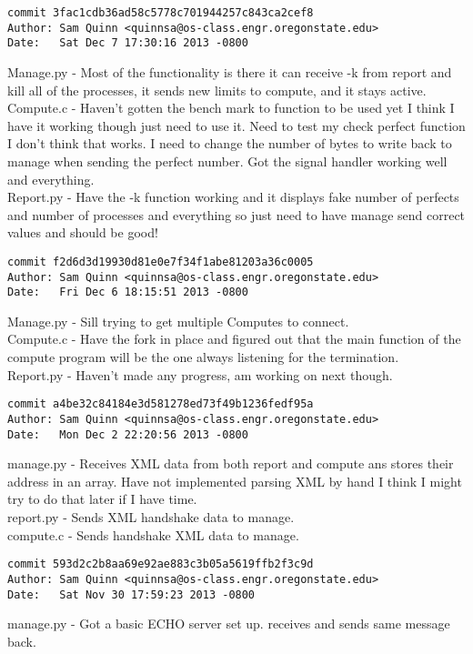 \documentclass[letterpaper,10pt,notitlepage,fleqn]{article}
\begin{document}
\begin{verbatim}
commit 3fac1cdb36ad58c5778c701944257c843ca2cef8
Author: Sam Quinn <quinnsa@os-class.engr.oregonstate.edu>
Date:   Sat Dec 7 17:30:16 2013 -0800
\end{verbatim}
    Manage.py - Most of the functionality is there it can receive -k from report and kill all of the processes, it sends new limits to compute, and it stays active.\\
    Compute.c - Haven't gotten the bench mark to function to be used yet I think I have it working though just need to use it. Need to test my check perfect function I don't think that works. I need to change the number of bytes to write back to manage when sending the perfect number. Got the signal handler working well and everything.\\
    Report.py - Have the -k function working and it displays fake number of perfects and number of processes and everything so just need to have manage send correct values and should be good!
\begin{verbatim}
commit f2d6d3d19930d81e0e7f34f1abe81203a36c0005
Author: Sam Quinn <quinnsa@os-class.engr.oregonstate.edu>
Date:   Fri Dec 6 18:15:51 2013 -0800
\end{verbatim}
    Manage.py - Sill trying to get multiple Computes to connect.\\
    Compute.c - Have the fork in place and figured out that the main function of the compute program will be the one always listening for the termination.\\
    Report.py - Haven't made any progress, am working on next though.
\begin{verbatim}
commit a4be32c84184e3d581278ed73f49b1236fedf95a
Author: Sam Quinn <quinnsa@os-class.engr.oregonstate.edu>
Date:   Mon Dec 2 22:20:56 2013 -0800
\end{verbatim}
    manage.py - Receives XML data from both report and compute ans stores their address in an array. Have not implemented parsing XML by hand I think I might try to do that later if I have time.\\
    report.py - Sends XML handshake data to manage.\\
    compute.c - Sends handshake XML data to manage.
\begin{verbatim}
commit 593d2c2b8aa69e92ae883c3b05a5619ffb2f3c9d
Author: Sam Quinn <quinnsa@os-class.engr.oregonstate.edu>
Date:   Sat Nov 30 17:59:23 2013 -0800
\end{verbatim}
    manage.py - Got a basic ECHO server set up. receives and sends same message back.\\
\end{document}
